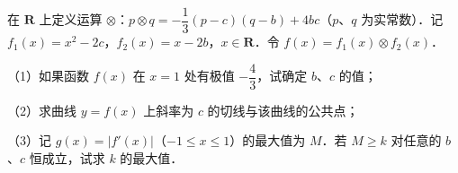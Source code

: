 \begin{question}
在 $\mathbf R$ 上定义运算 $\otimes$：$p\otimes q=-\dfrac13(p-c)(q-b)+4bc$（$p$、$q$ 为实常数）．记 $f_1(x)=x^2-2c$，$f_2(x)=x-2b$，$x\in\mathbf R$．令 $f(x)=f_1(x)\otimes f_2(x)$．

（1）如果函数 $f(x)$ 在 $x=1$ 处有极值 $-\dfrac43$，试确定 $b$、$c$ 的值；

（2）求曲线 $y=f(x)$ 上斜率为 $c$ 的切线与该曲线的公共点；

（3）记 $g(x)=|f'(x)|$（$-1\leqslant x\leqslant 1$）的最大值为 $M$．若 $M\geqslant k$ 对任意的 $b$、$c$ 恒成立，试求 $k$ 的最大值．

\end{question}